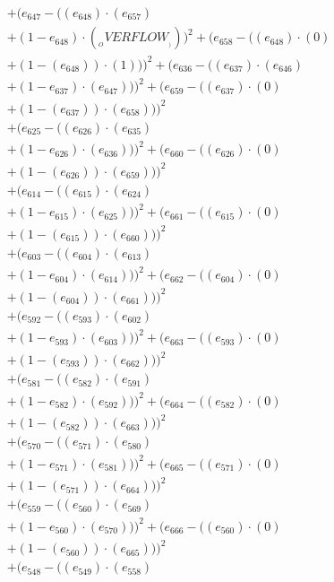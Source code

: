 \documentclass[10pt, a4paper]{article}
\begin{document}
\begin{small}
\begin{align*}
& + (e_{647} - ((e_{648})  \cdot  (e_{657}) \\
& + (1 - e_{648})  \cdot  (__OVERFLOW__)))^{2} + (e_{658} - ((e_{648}) \cdot (0) \\
& + (1 - (e_{648})) \cdot (1)))^{2} + (e_{636} - ((e_{637})  \cdot  (e_{646}) \\
& + (1 - e_{637})  \cdot  (e_{647})))^{2} + (e_{659} - ((e_{637}) \cdot (0) \\
& + (1 - (e_{637})) \cdot (e_{658})))^{2} \\
& + (e_{625} - ((e_{626})  \cdot  (e_{635}) \\
& + (1 - e_{626})  \cdot  (e_{636})))^{2} + (e_{660} - ((e_{626}) \cdot (0) \\
& + (1 - (e_{626})) \cdot (e_{659})))^{2} \\
& + (e_{614} - ((e_{615})  \cdot  (e_{624}) \\
& + (1 - e_{615})  \cdot  (e_{625})))^{2} + (e_{661} - ((e_{615}) \cdot (0) \\
& + (1 - (e_{615})) \cdot (e_{660})))^{2} \\
& + (e_{603} - ((e_{604})  \cdot  (e_{613}) \\
& + (1 - e_{604})  \cdot  (e_{614})))^{2} + (e_{662} - ((e_{604}) \cdot (0) \\
& + (1 - (e_{604})) \cdot (e_{661})))^{2} \\
& + (e_{592} - ((e_{593})  \cdot  (e_{602}) \\
& + (1 - e_{593})  \cdot  (e_{603})))^{2} + (e_{663} - ((e_{593}) \cdot (0) \\
& + (1 - (e_{593})) \cdot (e_{662})))^{2} \\
& + (e_{581} - ((e_{582})  \cdot  (e_{591}) \\
& + (1 - e_{582})  \cdot  (e_{592})))^{2} + (e_{664} - ((e_{582}) \cdot (0) \\
& + (1 - (e_{582})) \cdot (e_{663})))^{2} \\
& + (e_{570} - ((e_{571})  \cdot  (e_{580}) \\
& + (1 - e_{571})  \cdot  (e_{581})))^{2} + (e_{665} - ((e_{571}) \cdot (0) \\
& + (1 - (e_{571})) \cdot (e_{664})))^{2} \\
& + (e_{559} - ((e_{560})  \cdot  (e_{569}) \\
& + (1 - e_{560})  \cdot  (e_{570})))^{2} + (e_{666} - ((e_{560}) \cdot (0) \\
& + (1 - (e_{560})) \cdot (e_{665})))^{2} \\
& + (e_{548} - ((e_{549})  \cdot  (e_{558}) \\

\end{align*}
\end{small}
\end{document}
